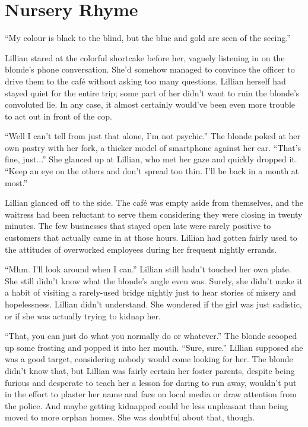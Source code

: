 \chapter{Nursery Rhyme}
\begin{ChapterNote}
``My colour is black to the blind, but the blue and gold are seen of the seeing.''
\end{ChapterNote}
\begin{Standard}
Lillian stared at the colorful shortcake before her, vaguely listening in on the
blonde's phone conversation. She'd somehow managed to convince the officer to drive
them to the caf\'e without asking too many questions. Lillian herself had stayed quiet
for the entire trip; some part of her didn't want to ruin the blonde's convoluted lie.
In any case, it almost certainly would've been even more trouble to act out in front
of the cop.

``Well I can't tell from just that alone, I'm not psychic.'' The blonde poked at her
own pastry with her fork, a thicker model of smartphone against her ear. ``That's
fine, just...'' She glanced up at Lillian, who met her gaze and quickly dropped it.
``Keep an eye on the others and don't spread too thin. I'll be back in a month at most.''

Lillian glanced off to the side. The caf\'e was empty aside from themselves, and the waitress
had been reluctant to serve them considering they were closing in twenty minutes. The few
businesses that stayed open late were rarely positive to customers that actually came in at
those hours. Lillian had gotten fairly used to the attitudes of overworked employees during
her frequent nightly errands.

``Mhm. I'll look around when I can.'' Lillian still hadn't touched her own plate. She still
didn't know what the blonde's angle even was. Surely, she didn't make it a habit of visiting
a rarely-used bridge nightly just to hear stories of misery and hopelessness. Lillian didn't
understand. She wondered if the girl was just sadistic, or if she was actually trying to kidnap
her.

``That, you can just do what you normally do or whatever.'' The blonde scooped up some frosting
and popped it into her mouth. ``Sure, sure.'' Lillian supposed she was a good target, considering
nobody would come looking for her. The blonde didn't know that, but Lillian was fairly certain
her foster parents, despite being furious and desperate to teach her a lesson for daring to
run away, wouldn't put in the effort to plaster her name and face on local media or draw attention
from the police. And maybe getting kidnapped could be less unpleasant than being moved to more
orphan homes. She was doubtful about that, though.


\end{Standard}
